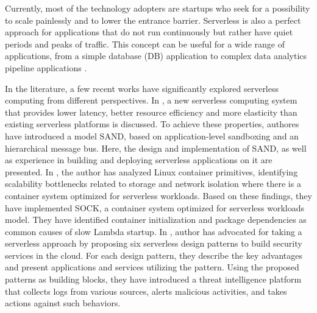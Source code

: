 
Currently, most of the technology adopters are startups who seek for a possibility to scale painlessly and to lower the entrance barrier. Serverless is also a perfect approach for applications that do not run continuously but rather have quiet periods and peaks of traffic. This concept can be useful for a wide range of applications, from a simple database (DB) application to complex data analytics pipeline applications \cite{Bhattacharjee_USENIX_2019}.
%	
% 

In the literature, a few recent works have significantly explored serverless computing from different perspectives. In \cite{Akkus_Sand_Usenix_2018}, a new serverless computing system that provides lower latency, better resource efficiency and more elasticity than existing serverless platforms is discussed. To achieve these properties, authores have introduced a model SAND, based on application-level sandboxing and an hierarchical message bus. Here, the design and implementation of SAND, as well as experience in building and deploying serverless applications on it are presented. In \cite{Oakes_USENIX_2018}, the author has analyzed Linux container primitives, identifying scalability bottlenecks related to storage and network isolation where there is a container system optimized for serverless workloads. Based on these findings, they have implemented SOCK, a container system optimized for serverless workloads model. They have identified container initialization and package dependencies as common causes of slow Lambda startup. In \cite{Hong_USENIX_2018}, author has advocated for taking a serverless approach by proposing six serverless design patterns to build security services in the cloud. For each design pattern, they describe the key advantages and present applications and services utilizing the pattern. Using the proposed patterns as building blocks, they have introduced a threat intelligence platform that collects logs from various sources,  alerts malicious activities, and takes actions against such behaviors.


